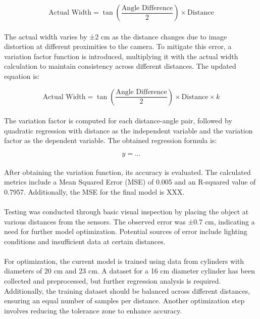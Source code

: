 \begin{equation}
\text{Actual Width} = \tan\left(\frac{\text{Angle Difference}}{2}\right) \times \text{Distance}
\end{equation}

\paragraph*{}
The actual width varies by ±2 cm as the distance changes due to image distortion at different proximities to the camera. To mitigate this error, a variation factor function is introduced, multiplying it with the actual width calculation to maintain consistency across different distances. The updated equation is:

\begin{equation}
\text{Actual Width} = \tan\left(\frac{\text{Angle Difference}}{2}\right) \times \text{Distance} \times k
\end{equation}

\paragraph{}
The variation factor is computed for each distance-angle pair, followed by quadratic regression with distance as the independent variable and the variation factor as the dependent variable. The obtained regression formula is:

\begin{equation}
y = ...
\end{equation}

\paragraph*{}
After obtaining the variation function, its accuracy is evaluated. The calculated metrics include a Mean Squared Error (MSE) of 0.005 and an R-squared value of 0.7957. Additionally, the MSE for the final model is XXX.

\paragraph*{}
Testing was conducted through basic visual inspection by placing the object at various distances from the sensors. The observed error was ±0.7 cm, indicating a need for further model optimization. Potential sources of error include lighting conditions and insufficient data at certain distances.

\paragraph*{}
For optimization, the current model is trained using data from cylinders with diameters of 20 cm and 23 cm. A dataset for a 16 cm diameter cylinder has been collected and preprocessed, but further regression analysis is required. Additionally, the training dataset should be balanced across different distances, ensuring an equal number of samples per distance. Another optimization step involves reducing the tolerance zone to enhance accuracy.

